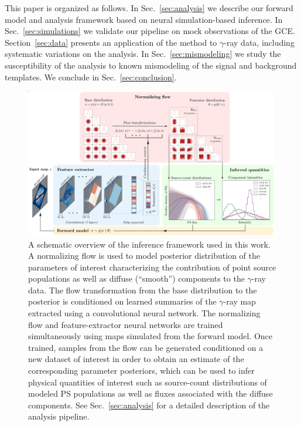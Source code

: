 \documentclass[prd,aps,10pt,nofootinbib,twocolumn,superscriptaddress,preprintnumbers,balancelastpage,longbibliography,floatfix]{revtex4-2}
\begin{document}
This paper is organized as follows. In Sec.~\ref{sec:analysis} we describe our forward model and analysis framework based on neural simulation-based inference. In Sec.~\ref{sec:simulations} we validate our pipeline on mock observations of the \Fermi GCE. Section~\ref{sec:data} presents an application of the method to \Fermi $\gamma$-ray data, including systematic variations on the analysis. In Sec.~\ref{sec:mismodeling} we study the susceptibility of the analysis to known mismodeling of the signal and background templates. We conclude in Sec.~\ref{sec:conclusion}.

%
\begin{figure}
\centering
\includegraphics[width=0.99\textwidth]{plots/figure.pdf}
\caption{A schematic overview of the inference framework used in this work. A normalizing flow is used to model posterior distribution of the parameters of interest characterizing the contribution of point source populations as well as diffuse (``smooth'') components to the $\gamma$-ray data. The flow transformation from the base distribution to the posterior is conditioned on learned summaries of the $\gamma$-ray map extracted using a convolutional neural network. The normalizing flow and feature-extractor neural networks are trained simultaneously using maps simulated from the forward model. Once trained, samples from the flow can be generated conditioned on a new dataset of interest in order to obtain an estimate of the corresponding parameter posteriors, which can be used to infer physical quantities of interest such as source-count distributions of modeled PS populations as well as fluxes associated with the diffuse components. See Sec.~\ref{sec:analysis} for a detailed description of the analysis pipeline.}
\label{fig:figure}
\end{figure}
%
\end{document}
